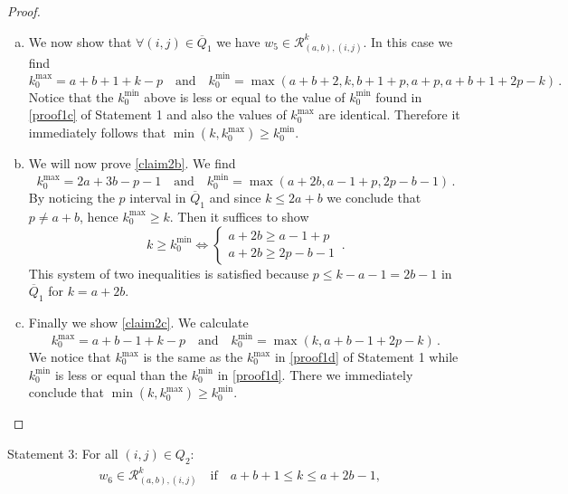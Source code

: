 \documentclass[a4paper,11pt]{article}
\theoremstyle{plain}
\theoremstyle{definition}
\newcommand{\kmin}{k_0^{\text{min}}}
\newcommand{\kmax}{k_0^{\text{max}}}
\begin{document}
\begin{description}[wide, labelwidth=!, labelindent=0pt]
\begin{proof}
\begin{enumerate}[(a)]
\begin{equation}
    \end{equation}
     The system of two inequalities above is satisfied due to $p\leq k-a-1$ in $\overline{Q}_1$.
    \item We now show that $\forall(i,j)\in \overline{Q}_1$ we have $w_5\in \mathcal{R}^k_{(a,b),(i,j)}$. In this case we find
    \begin{equation}
        \kmax=a+b+1+k-p \quad \text{and}\quad \kmin=\operatorname{max}(a+b+2,k,b+1+p,a+p,a+b+1+2p-k)\,.
    \end{equation}
    Notice that the $\kmin$ above is less or equal to the value of $\kmin$ found in \ref{proof1c} of Statement 1  and also the values of $\kmax$ are identical. Therefore it immediately follows that $\operatorname{min}(k,\kmax)\geq \kmin$.
    \item We will now prove \eqref{claim2b}. We find
    \begin{equation}
        \kmax= 2a+3b-p-1 \quad \text{and}\quad \kmin=\operatorname{max}(a+2b,a-1+p,2p-b-1)\,.
    \end{equation}
    By noticing the $p$ interval in $\overline{Q}_1$ and since $k\leq 2a+b$ we conclude that $p\neq a+b$, hence $\kmax \geq k$. Then it suffices to show
    \begin{equation}
            k\geq \kmin \Longleftrightarrow  \left\{\begin{array}{lr}
        a+2b\geq a-1+p\\
        a+2b\geq 2p-b-1
        \end{array}\right. \,.
    \end{equation}
    This system of two inequalities is satisfied because $p\leq k-a-1=2b-1$ in $\overline{Q}_1$ for $k=a+2b$.
    \item Finally we show \eqref{claim2c}. We calculate
        \begin{equation}
            \kmax=a+b-1+k-p \quad\text{and}\quad \kmin=\operatorname{max}(k,a+b-1+2p-k)\,.
        \end{equation}
        We notice that $\kmax$ is the same as the $\kmax$ in \ref{proof1d} of Statement 1 while $\kmin$ is less or equal than the $\kmin$ in \ref{proof1d}. There we immediately conclude that $\operatorname{min}(k,\kmax)\geq \kmin$.
    \end{enumerate}
\end{proof}
\item{Statement 3:} For all $(i,j)\in Q_2$:
\begin{align}
    &w_6\in \mathcal{R}^k_{(a,b),(i,j)}\quad\text{if}\quad a+b+1\leq k\leq a+2b-1,\\

\end{align}
\end{description}
\end{document}
